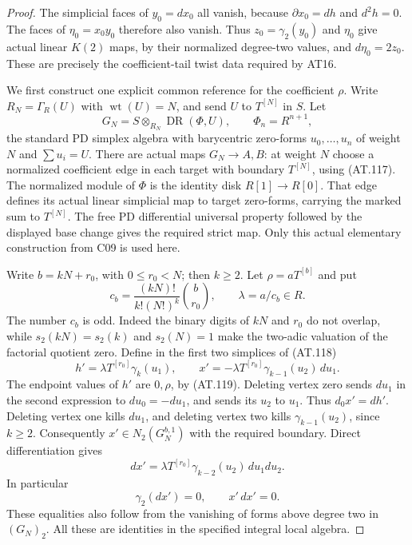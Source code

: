 \begin{proof}
The simplicial faces of $y_0=dx_0$ all vanish, because
$\partial x_0=dh$ and $d^2h=0$.
The faces of $\eta_0=x_0y_0$ therefore also vanish.
Thus $z_0=\gamma_2(y_0)$ and $\eta_0$ give actual linear
$K(2)$ maps, by their normalized degree-two values, and
$d\eta_0=2z_0$. These are precisely the coefficient-tail
twist data required by AT16.

We first construct one explicit common reference for the
coefficient $\rho$. Write $R_N=\Gamma_R(U)$ with
$\operatorname{wt}(U)=N$, and send $U$ to $T^{[N]}$ in $S$.
Let
\[
 G_N=S\otimes_{R_N}\operatorname{DR}(\Phi,U),
 \qquad \Phi_n=R^{n+1},
 \tag{AT.118}
\]
the standard PD simplex algebra with barycentric
zero-forms $u_0,\ldots,u_n$ of weight $N$ and
$\sum u_i=U$. There are actual maps $G_N\to A,B$:
at weight $N$ choose a normalized coefficient edge in
each target with boundary $T^{[N]}$, using (AT.117).
The normalized module of $\Phi$ is the identity disk
$R[1]\to R[0]$. That edge defines its actual linear
simplicial map to target zero-forms, carrying the marked
sum to $T^{[N]}$. The free PD differential universal
property followed by the displayed base change gives
the required strict map. Only this actual elementary
construction from C09 is used here.

Write $b=kN+r_0$, with $0\leq r_0<N$; then $k\geq2$.
Let $\rho=aT^{[b]}$ and put
\[
 c_b=\frac{(kN)!}{k!(N!)^k}\binom b{r_0},
                    \qquad \lambda=a/c_b\in R.
 \tag{AT.119}
\]
The number $c_b$ is odd. Indeed the binary digits of
$kN$ and $r_0$ do not overlap, while
$s_2(kN)=s_2(k)$ and $s_2(N)=1$ make the two-adic
valuation of the factorial quotient zero.
Define in the first two simplices of (AT.118)
\[
 h'=\lambda T^{[r_0]}\gamma_k(u_1),\qquad
 x'=-\lambda T^{[r_0]}\gamma_{k-1}(u_2)\,du_1 .
 \tag{AT.120}
\]
The endpoint values of $h'$ are $0,\rho$, by (AT.119).
Deleting vertex zero sends $du_1$ in the second expression
to $du_0=-du_1$, and sends its $u_2$ to $u_1$.
Thus $d_0x'=dh'$. Deleting vertex one kills $du_1$,
and deleting vertex two kills $\gamma_{k-1}(u_2)$,
since $k\geq2$. Consequently $x'\in N_2(G_N^{b,1})$
with the required boundary. Direct differentiation gives
\[
       dx'=\lambda T^{[r_0]}
                     \gamma_{k-2}(u_2)\,du_1du_2 .
 \tag{AT.121}
\]
In particular
\[
                    \gamma_2(dx')=0,\qquad x'\,dx'=0.
 \tag{AT.122}
\]
These equalities also follow from the vanishing of forms
above degree two in $(G_N)_2$. All these are identities
in the specified integral local algebra.


\end{proof}
